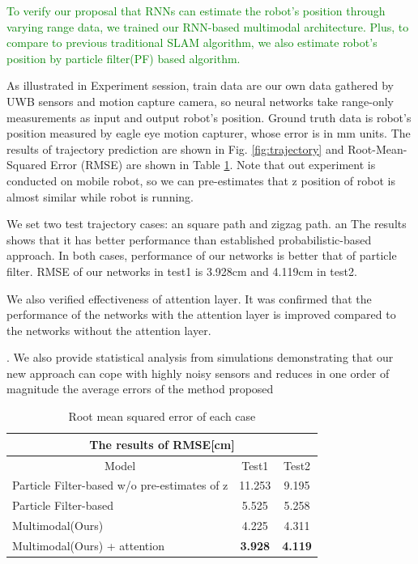 \documentclass{ieeeaccess}
\begin{document}
\textcolor{green}{To verify our proposal that RNNs can estimate the robot's position through varying range data, we trained our RNN-based multimodal architecture. Plus, to compare to previous traditional SLAM algorithm, we also estimate robot's position by particle filter(PF) based algorithm.}

As illustrated in Experiment session, train data are our own data gathered by UWB sensors and motion capture camera, so neural networks take range-only measurements as input and output robot's position. Ground truth data is robot's position measured by eagle eye motion capturer, whose error is in mm units. The results of trajectory prediction are shown in Fig. \ref{fig:trajectory} and Root-Mean-Squared Error (RMSE) are shown in Table \ref{table:RMSE_table}. Note that out experiment is conducted on mobile robot, so we can pre-estimates that z position of robot is almost similar while robot is running. 

We set two test trajectory cases: an square path and zigzag path. an The results shows that it has better performance than established probabilistic-based approach. In both cases, performance of our networks  is better that of particle filter. RMSE of our networks in test1 is 3.928cm and 4.119cm in test2.

We also verified effectiveness of attention layer. It was confirmed that the performance of the networks with the attention layer is improved compared to the networks without the attention layer.


. We also provide statistical analysis from simulations demonstrating that
our new approach can cope with highly noisy sensors and
reduces in one order of magnitude the average errors of the
method proposed

\begin{table}[h]
	\begin{tabular}{lllcc}
		\hline
		\multicolumn{5}{c}{The results of RMSE{[}cm{]}}                                                                          \\ \hline
		\multicolumn{3}{c|}{Model}                                        & \multicolumn{1}{c|}{Test1}          & Test2          \\ \hline
		\multicolumn{3}{l|}{Particle Filter-based w/o pre-estimates of z} & \multicolumn{1}{c|}{11.253}         & 9.195          \\
		\multicolumn{3}{l|}{Particle Filter-based}                        & \multicolumn{1}{c|}{5.525}          & 5.258          \\
		\multicolumn{3}{l|}{Multimodal(Ours)}                                   & \multicolumn{1}{c|}{4.225}          & 4.311          \\
		\multicolumn{3}{l|}{Multimodal(Ours) + attention}                       & \multicolumn{1}{c|}{\textbf{3.928}} & \textbf{4.119}
	\end{tabular}
	\caption{Root mean squared error of each case}
	\label{table:RMSE_table}
\end{table}
\end{document}

